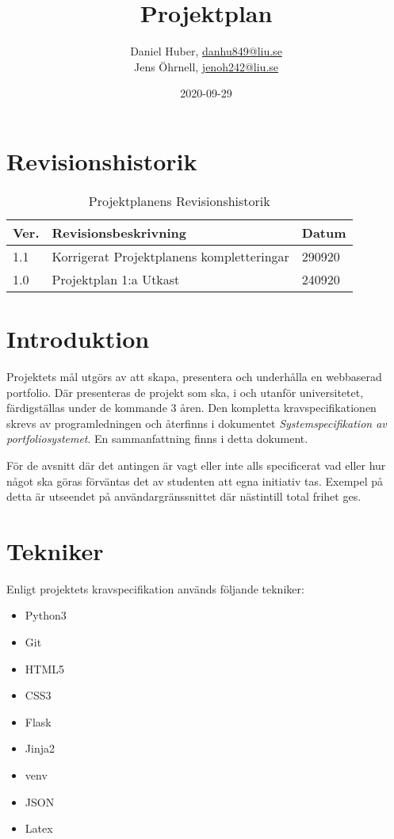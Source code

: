 \documentclass{TDP003mall}
\author{Daniel Huber, \url{danhu849@liu.se}\\
  Jens Öhrnell, \url{jenoh242@liu.se}}
\title{Projektplan}
\date{2020-09-29}
\begin{document}
\projectpage

\tableofcontents

\newpage
\section{Revisionshistorik}
\begin{table}[!h]
  \caption{Projektplanens Revisionshistorik\label{tab:1}}
\begin{tabularx}{\linewidth}{|l|X|l|}
\hline
  Ver. & Revisionsbeskrivning & Datum \\\hline
  1.1 & Korrigerat Projektplanens kompletteringar & 290920 \\\hline
  1.0 & Projektplan 1:a Utkast & 240920 \\\hline
\end{tabularx}
\end{table}


\section{Introduktion}
Projektets mål utgörs av att skapa, presentera och underhålla en webbaserad portfolio. Där presenteras de projekt som ska, i och utanför universitetet, färdigställas under de kommande 3 åren. Den kompletta kravspecifikationen skrevs av programledningen och återfinns i dokumentet \textit{Systemspecifikation av portfoliosystemet}. En sammanfattning finns i detta dokument.

För de avsnitt där det antingen är vagt eller inte alls specificerat vad eller hur något ska göras förväntas det av studenten att egna initiativ tas. Exempel på detta är utseendet på användargränssnittet där nästintill total frihet ges.

\section{Tekniker}
Enligt projektets kravspecifikation används följande tekniker:
\begin{itemize}
\item Python3
\item Git
\item HTML5
\item CSS3
\item Flask
\item Jinja2
\item venv
\item JSON
\item Latex
\end{itemize}
\end{document}
